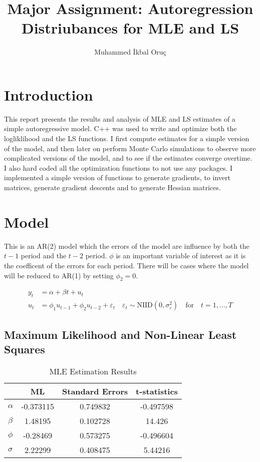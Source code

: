 \documentclass[12pt]{article}
\author{Muhammed İkbal Oruç}
\title{Major Assignment: Autoregression Distriubances for MLE and LS}
\begin{document}
\maketitle

\section*{Introduction}

This report presents the results and analysis of MLE and LS estimates
of a simple autoregressive model. C++ was used to write and optimize both the logliklihood and the LS functions. I first compute estimates 
for a simple version of the model, and then later on perform Monte Carlo 
simulations to observe more complicated versions of the model, and to 
see if the estimates converge overtime. I also hard coded all the optimization functions to not use any packages. I implemented a simple version 
of functions to generate gradients, to invert matrices, generate gradient descents and to generate Hessian matrices.

\section*{Model}

This is an AR(2) model which the errors of the model are influence 
by both the $t-1$ period and the $t-2$ period. $\phi$ is an important 
variable of interest as it is the coefficent of the errors for each 
period. There will be cases where the model will be reduced to AR(1)
by setting $\phi_2 = 0$.

\begin{align*}
    y_t &= \alpha + \beta t + u_t \\
    u_t &= \phi_1 u_{t-1} + \phi_2 u_{t-2} + \varepsilon_t \quad \varepsilon_t \sim \text{NIID}(0, \sigma^2_\varepsilon) \quad \text{for} \quad t = 1, \ldots, T
\end{align*}

\subsection*{Maximum Likelihood and Non-Linear Least Squares}

\begin{center}
    \begin{table}[H]
        \centering
        \begin{tabular}{lccc}
            \toprule
            & ML & Standard Errors & t-statistics \\
            \midrule
            $\alpha$ & -0.373115 & 0.749832 & -0.497598 \\
            $\beta$ & 1.48195 & 0.102728 & 14.426 \\
            $\phi$ & -0.28469 & 0.573275 & -0.496604 \\
            $\sigma$ & 2.22299 & 0.408475 & 5.44216 \\
            \bottomrule
        \end{tabular}
        \caption{MLE Estimation Results}
        \label{tab:results}
    \end{table}
\end{center}
\end{document}
